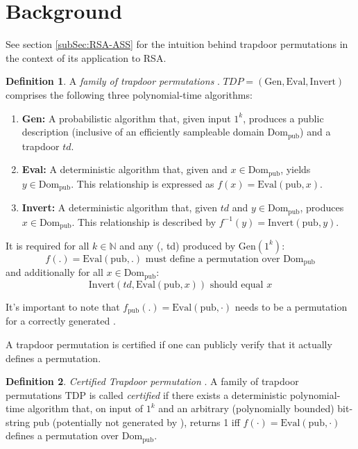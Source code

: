 \documentclass[]{final_report}
\theoremstyle{definition}
\newtheorem{definition}{Definition}[chapter]
\begin{document}
\section{Background}
See section \ref{subSec:RSA-ASS} for the intuition behind trapdoor permutations in the context of its application to RSA.
\begin{definition}
\label{def:TDP}
A \textit{family of trapdoor permutations} \cite{10.1145/147508.147537}. \( TDP = (\text{Gen}, \text{Eval}, \text{Invert}) \) comprises the following three polynomial-time algorithms:
\begin{enumerate}
    \item \textbf{Gen:} A probabilistic algorithm that, given input \( 1^k \), produces a public description  (inclusive of an efficiently sampleable domain \( \text{Dom}_{\text{pub}} \)) and a trapdoor \( td \).
    
    \item \textbf{Eval:} A deterministic algorithm that, given  and \( x \in \text{Dom}_{\text{pub}} \), yields \( y \in \text{Dom}_{\text{pub}} \). This relationship is expressed as \( f(x) = \text{Eval}(\text{pub}, x) \).
    
    \item \textbf{Invert:} A deterministic algorithm that, given \( td \) and \( y \in \text{Dom}_{\text{pub}} \), produces \( x \in \text{Dom}_{\text{pub}} \). This relationship is described by \( f^{-1}(y) = \text{Invert}(\text{pub}, y) \).
\end{enumerate}

It is required for all \( k \in \mathbb{N} \) and any (, td) produced by \(\text{Gen}(1^k)\):
\[ f(.) = \text{Eval}(\text{pub}, .) \text{ must define a permutation over } \text{Dom}_{\text{pub}} \]
and additionally for all \( x \in \text{Dom}_{\text{pub}} \):
\[ \text{Invert}(td, \text{Eval}(\text{pub}, x)) \text{ should equal } x \]

It's important to note that \( f_{\text{pub}}(.) = \text{Eval}(\text{pub}, \cdot) \) needs to be a permutation for a correctly generated . 
\end{definition}

A trapdoor permutation is certified if one can publicly verify that it actually defines a permutation. 

\begin{definition} \textit{Certified Trapdoor permutation} \cite{10.1007/3-540-48071-4_31, bellare1996certifying, 10.1007/978-3-642-34961-4_25}.
\label{def:CTDP}
A family of trapdoor permutations \( \text{TDP} \) is called \textit{certified} if there exists a deterministic polynomial-time algorithm  that, on input of \( 1^k \) and an arbitrary (polynomially bounded) bit-string \( \text{pub} \) (potentially not generated by ), returns 1 iff \( f(\cdot) = \text{Eval}(\text{pub}, \cdot) \) defines a permutation over \( \text{Dom}_{\text{pub}} \).
\end{definition}
\end{document}
